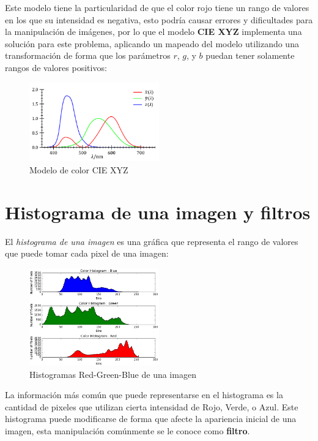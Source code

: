 \documentclass[a4paper, 12pt]{article}
\begin{document}
Este modelo tiene la particularidad de que el color rojo tiene un rango de valores en los que su intensidad es negativa, esto podría causar errores y dificultades para la manipulación de imágenes, por lo que el modelo \textbf{CIE XYZ} implementa una solución para este problema, aplicando un mapeado del modelo utilizando una transformación de forma que los parámetros $r$, $g$, y $b$ puedan tener solamente rangos de valores positivos:

\begin{figure}[!ht]
    \centering
    \includegraphics[width=0.5\textwidth]{img/cie-xyz.png}
    \caption{Modelo de color CIE XYZ}
    \label{fig:modelo-cie-xyz}
\end{figure}

\section{Histograma de una imagen y filtros}
El \emph{histograma de una imagen} es una gráfica que representa el rango de valores que puede tomar cada pixel de una imagen:

\begin{figure}
    \centering
    \includegraphics[width=0.5\textwidth]{img/histograma-rgb.png}
    \caption{Histogramas Red-Green-Blue de una imagen}
    \label{fig:histogramas-rgb}
\end{figure}

La información más común que puede representarse en el histograma es la cantidad de pixeles que utilizan cierta intensidad de Rojo, Verde, o Azul. Este histograma puede modificarse de forma que afecte la apariencia inicial de una imagen, esta manipulación comúnmente se le conoce como \textbf{filtro}.
\end{document}
